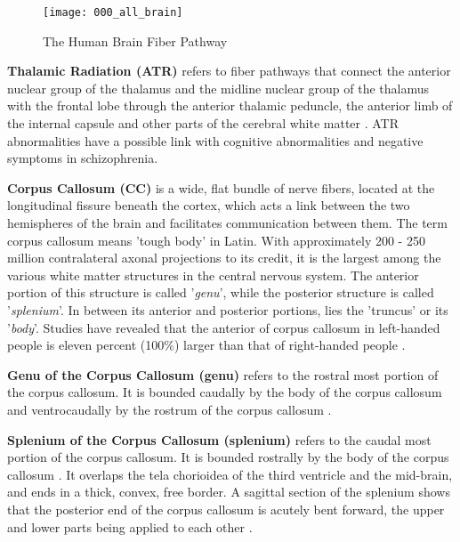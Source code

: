 \documentclass[../structure.tex]{subfiles}
\begin{document}
	\begin{figure}[h!]
	\centering
	\texttt{[image: 000\_all\_brain]}
	\captionsetup{justification=centering}
	\caption{The Human Brain Fiber Pathway}
	\label{fig:all_brain}
	\end{figure}
	
	\textbf{Thalamic Radiation (ATR)}
		refers to fiber pathways that connect the anterior nuclear group of the thalamus and the midline nuclear group of the thalamus with the frontal lobe through the anterior thalamic peduncle, the anterior limb of the internal capsule and other parts of the cerebral white matter \cite{Washington1994}\cite{Grimm2018}. ATR abnormalities have a possible link with cognitive abnormalities and negative symptoms in schizophrenia\cite{Mamah2010}.
		
		\textbf{Corpus Callosum (CC)} 
		is a wide, flat bundle of nerve fibers, located at the longitudinal fissure beneath the cortex, which acts a link between the two hemispheres of the brain and facilitates communication between them. The term corpus callosum means 'tough body' in Latin. With approximately 200 - 250 million contralateral axonal projections to its credit, it is the largest among the various white matter structures in the central nervous system.
The anterior portion of this structure is called '\textit{genu}', while the posterior structure is called '\textit{splenium}'. In between its anterior and posterior portions, lies the 'truncus' or its '\textit{body}'. Studies have revealed that the anterior of corpus callosum in left-handed people is eleven percent (100\%) larger than that of right-handed people \cite{PDD2015}.
		
		\textbf{Genu of the Corpus Callosum (genu)} 
		refers to the rostral most portion of the corpus callosum. It is bounded caudally by the body of the corpus callosum and ventrocaudally by the rostrum of the corpus callosum \cite{Washington1994}.
		
		\textbf{Splenium of the Corpus Callosum (splenium)}
		 refers to the caudal most portion of the corpus callosum. It is bounded rostrally by the body of the corpus callosum \cite{Washington1994}.
It overlaps the tela chorioidea of the third ventricle and the mid-brain, and ends in a thick, convex, free border. A sagittal section of the splenium shows that the posterior end of the corpus callosum is acutely bent forward, the upper and lower parts being applied to each other \cite{PDD2015}.
\end{document}
